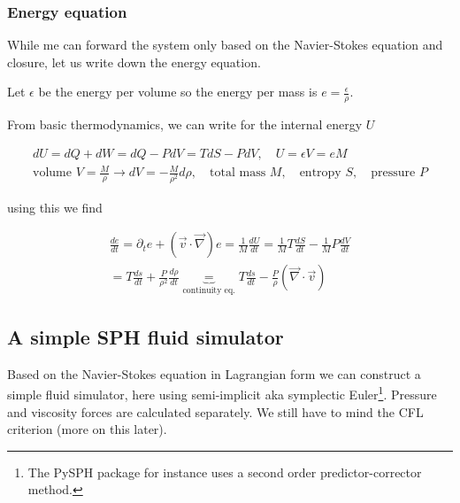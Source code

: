 
\subsubsection{Energy equation}
While me can forward the system only based on the Navier-Stokes equation and closure,
let us write down the energy equation.

Let $\epsilon$ be the energy per volume so the energy per mass is $e = \frac{\epsilon}{\rho}$.

From basic thermodynamics, we can write for the internal energy $U$

\begin{equation}
    \begin{gathered}
        dU = dQ + dW = dQ - PdV = T dS - P dV, \quad U = \epsilon V = eM \\
        \text{volume } V = \frac{M}{\rho} \rightarrow dV = -\frac{M}{\rho^2} d\rho, \quad \text{total mass } M, \quad \text{entropy } S, \quad \text{pressure } P
    \end{gathered}
\end{equation}

using this we find

\begin{equation}
    \begin{gathered}
        \frac{de}{dt} = \partial_t e + (\vec{v} \cdot \vec{\nabla}) e = \frac{1}{M} \frac{dU}{dt} = \frac{1}{M} T \frac{dS}{dt} - \frac{1}{M} P \frac{dV}{dt} \\
        = T \frac{ds}{dt} + \frac{P}{\rho^2} \frac{d\rho}{dt} \underbrace{=}_{\text{continuity eq.}} T \frac{ds}{dt} - \frac{P}{\rho} (\vec{\nabla} \cdot \vec{v})
    \end{gathered}
\end{equation}

\subsection{A simple SPH fluid simulator\skipthis}

Based on the Navier-Stokes equation in Lagrangian form
we can construct a simple fluid simulator, here using
semi-implicit aka symplectic Euler\footnote{The PySPH package for 
instance uses a second order predictor-corrector method.}. Pressure and viscosity
forces are calculated separately. We still have to mind the CFL criterion (more on this later).

